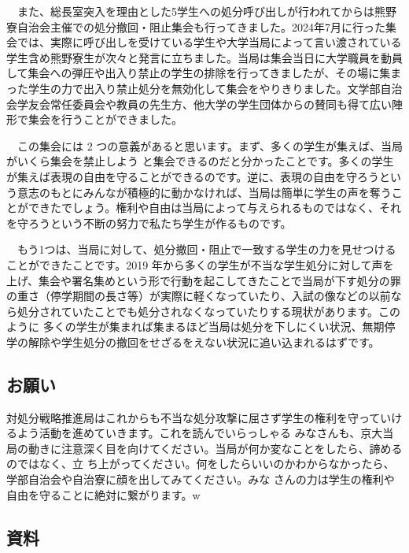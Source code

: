 　また、総長室突入を理由とした5学生への処分呼び出しが行われてからは熊野寮自治会主催での処分撤回・阻止集会も行ってきました。2024年7月に行った集会では、実際に呼び出しを受けている学生や大学当局によって言い渡されている学生含め熊野寮生が次々と発言に立ちました。当局は集会当日に大学職員を動員して集会への弾圧や出入り禁止の学生の排除を行ってきましたが、その場に集まった学生の力で出入り禁止処分を無効化して集会をやりきりました。文学部自治会学友会常任委員会や教員の先生方、他大学の学生団体からの賛同も得て広い陣形で集会を行うことができました。

　この集会には 2 つの意義があると思います。まず、多くの学生が集えば、当局がいくら集会を禁止しよう と集会できるのだと分かったことです。多くの学生が集えば表現の自由を守ることができるのです。逆に、表現の自由を守ろうという意志のもとにみんなが積極的に動かなければ、当局は簡単に学生の声を奪うことができたでしょう。権利や自由は当局によって与えられるものではなく、それを守ろうという不断の努力で私たち学生が作るものです。

　もう1つは、当局に対して、処分撤回・阻止で一致する学生の力を見せつけることができたことです。2019 年から多くの学生が不当な学生処分に対して声を上げ、集会や署名集めという形で行動を起こしてきたことで当局が下す処分の罪の重さ（停学期間の長さ等）が実際に軽くなっていたり、入試の像などの以前なら処分されていたことでも処分されなくなっていたりする現状があります。このように 多くの学生が集まれば集まるほど当局は処分を下しにくい状況、無期停学の解除や学生処分の撤回をせざるをえない状況に追い込まれるはずです。 


\subsection{お願い}
対処分戦略推進局はこれからも不当な処分攻撃に屈さず学生の権利を守っていけるよう活動を進めていきます。これを読んでいらっしゃる みなさんも、京大当局の動きに注意深く目を向けてください。当局が何か変なことをしたら、諦めるのではなく、立 ち上がってください。何をしたらいいのかわからなかったら、学部自治会や自治寮に顔を出してみてください。みな さんの力は学生の権利や自由を守ることに絶対に繋がります。w

\subsection{資料}


